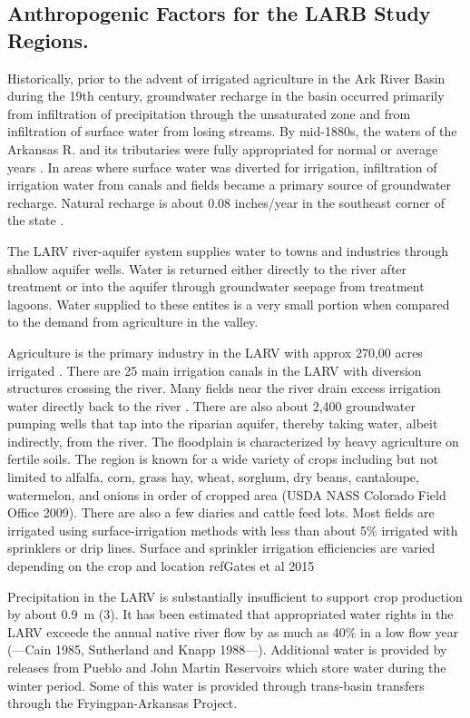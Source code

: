 \begin{linenumbers}[1]
\subsection*{Anthropogenic Factors for the LARB Study Regions.}

Historically, prior to the advent of irrigated agriculture in the Ark River Basin during the 19th century, groundwater recharge in the basin occurred primarily from infiltration of precipitation through the unsaturated zone and from infiltration of surface water from losing streams.  By mid-1880s, the waters of the Arkansas R. and its tributaries were fully appropriated for normal or average years \citep{Abbott1985}.  In areas where surface water was diverted for irrigation, infiltration of irrigation water from canals and fields became a primary source of groundwater recharge.  Natural recharge is about 0.08 inches/year in the southeast corner of the state \citep{Wolock2003}.

The LARV river-aquifer system supplies water to towns and industries through shallow aquifer wells.  Water is returned either directly to the river after treatment or into the aquifer through groundwater seepage from treatment lagoons.  Water supplied to these entites is a very small portion when compared to the demand from agriculture in the valley.

Agriculture is the primary industry in the LARV with approx 270,00 acres irrigated \citep{Bailey2015,Miller2010}.  There are 25 main irrigation canals in the LARV with diversion structures crossing the river.  Many fields near the river drain excess irrigation water directly back to the river \citep{Bailey2012,Morway2013}.  There are also about 2,400 groundwater pumping wells that tap into the riparian aquifer, thereby taking water, albeit indirectly, from the river.  The floodplain is characterized by heavy agriculture on fertile soils.  The region is known for a wide variety of crops including but not limited to alfalfa, corn, grass hay, wheat, sorghum, dry beans, cantaloupe, watermelon, and onions in order of cropped area (USDA NASS Colorado Field Office 2009).  There are also a few diaries and cattle feed lots.  Most fields are irrigated using surface-irrigation methods with less than about 5\% irrigated with sprinklers or drip lines.  Surface and sprinkler irrigation efficiencies are varied depending on the crop and location \citet{Bailey2012Phd} ref{Gates et al 2015}

Precipitation in the LARV is substantially insufficient to support crop production by about \SI{0.9}{\meter} (\SI{3}{\foot}).  It has been estimated that appropriated water rights in the LARV exceede the annual native river flow by as much as 40\% in a low flow year (---Cain 1985, Sutherland and Knapp 1988---).  Additional water is provided by releases from Pueblo and John Martin Reservoirs which store water during the winter period.  Some of this water is provided through trans-basin transfers through the Fryingpan-Arkansas Project.


\end{linenumbers}

